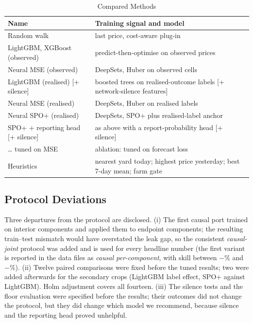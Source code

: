 \documentclass{ieeeaccess}
\begin{document}
\begin{table}[!t]
\caption{Compared Methods}
\label{tab:methods}
\centering
\setlength{\tabcolsep}{3pt}
\footnotesize
\begin{tabular}{p{2.3cm}p{5.5cm}}
\toprule
Name & Training signal and model\\
\midrule
Random walk & last price, cost-aware plug-in\\
LightGBM, XGBoost (observed) & predict-then-optimise on observed prices\\
Neural MSE (observed) & DeepSets, Huber on observed cells\\
LightGBM (realised) [+ silence] & boosted trees on realised-outcome labels [+ network-silence features]\\
Neural MSE (realised) & DeepSets, Huber on realised labels\\
Neural SPO+ (realised) & DeepSets, SPO+ plus realised-label anchor\\
SPO+ + reporting head [+ silence] & as above with a report-probability head [+ silence]\\
\ldots{} tuned on MSE & ablation: tuned on forecast loss\\
Heuristics & nearest yard today; highest price yesterday; best 7-day mean; farm gate\\
\bottomrule
\end{tabular}
\end{table}

\subsection{Protocol Deviations}
\label{sec:dev}
Three departures from the protocol are disclosed. (i) The first causal port trained on interior components and applied them to endpoint components; the resulting train--test mismatch would have overstated the leak gap, so the consistent \emph{causal-joint} protocol was added and is used for every headline number (the first variant is reported in the data files as \emph{causal per-component}, with skill between $-$\PercompLoAbs{}\% and $-$\PercompHiAbs{}\%). (ii) Twelve paired comparisons were fixed before the tuned results; two were added afterwards for the secondary crops (LightGBM label effect, SPO+ against LightGBM). Holm adjustment covers all fourteen. (iii) The silence tests and the floor evaluation were specified before the results; their outcomes did not change the protocol, but they did change which model we recommend, because silence and the reporting head proved unhelpful.
\end{document}
